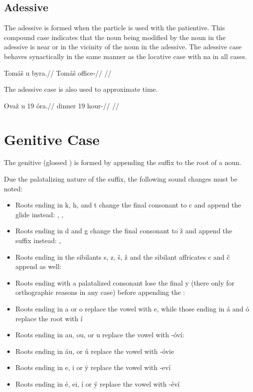\subsection{Adessive}
The adessive is formed when the particle  is used with the patientive. This compound case indicates that the noun being modified by the noun in the adessive is near or in the vicinity of the noun in the adessive. The adessive case behaves synactically in the same manner as the locative case with na in all cases.

\pex
\begingl
\gla Tom\'a\v{s} u byra.//
\glb Tom\'a\v{s}  office-//
\glft {}//
\endgl
\xe

The adessive case is also used to approximate time.

\pex
\begingl
\gla Ova\v{z} u 19 \'ora.//
\glb dinner  19 hour-//
\glft {}//
\endgl
\xe

\section{Genitive Case}

The genitive (glossed ) is formed by appending the suffix  to the root of a noun.

Due the palatalizing nature of the suffix, the following sound changes must be noted:

\begin{itemize}
	\item Roots ending in k, h, and t change the final consonant to c and append the glide  instead:  ,  ,  
	\item Roots ending in d and g change the final consonant to \v{z} and append the suffix  instead:  ,  
	\item Roots ending in the sibilants s, z, \v{s}, \v{z} and the sibilant affricates c and \v{c} append  as well:
	\item Roots ending with a palatalized consonant lose the final y (there only for orthographic reasons in any case) before appending the : 
	\item Roots ending in a or o replace the vowel with e, while those ending in \'a and \'o replace the root with \'i
	\item Roots ending in au, ou, or u replace the vowel with -\'ov\'i:  
	\item Roots ending in \'au, or \'u replace the vowel with -\'ovie
	\item Roots ending in e, i or \"y replace the vowel with -ev\'i
	\item Roots ending in \'e, ei, \'i or \'y replace the vowel with -\'ev\'i
\end{itemize}


